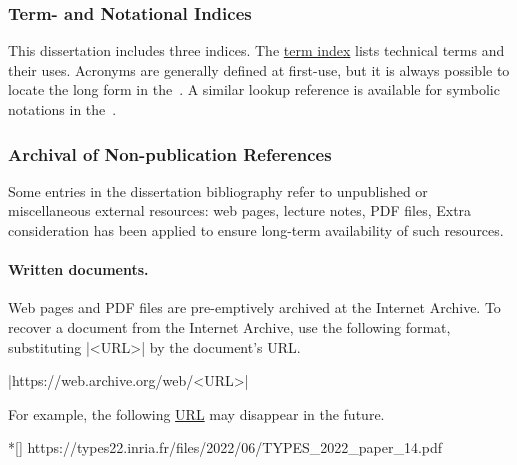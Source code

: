 
\subsubsection{Term- and Notational Indices}

This dissertation includes three indices.
The \hyperref[sec:app:index]{term index} lists technical terms and their uses.
Acronyms are generally defined at first-use, but it is always possible to locate the long form in the~\nameref{\acronymtype}.
A similar lookup reference is available for symbolic notations in the~.

\subsubsection{Archival of Non-publication References}

Some entries in the dissertation bibliography refer to unpublished or miscellaneous external resources: web pages, lecture notes, PDF files, \etc
Extra consideration has been applied to ensure long-term availability of such resources.

\paragraph*{Written documents.}
Web pages and PDF files are pre-emptively archived at the Internet Archive.
To recover a document from the Internet Archive, use the following format, substituting \pr|<URL>| by the document's URL\@.

\begin{center}
\pr|https://web.archive.org/web/<URL>|
\end{center}

For example, the following \href{https://types22.inria.fr/files/2022/06/TYPES_2022_paper_14.pdf}{URL} may disappear in the future.

\begin{center}
\begin{minipage}{\textwidth}
\begin{cmdlisting}*[]
https://types22.inria.fr/files/2022/06/TYPES_2022_paper_14.pdf
\end{cmdlisting}
\end{minipage}
\end{center}

